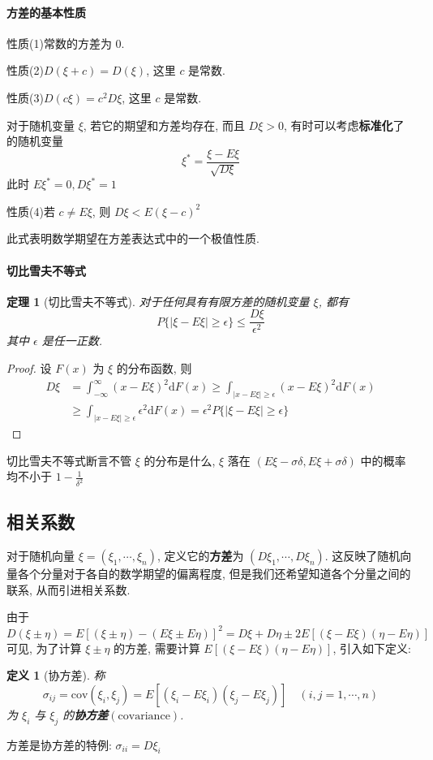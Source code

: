 \documentclass[12pt,a4paper]{article}
\newtheorem{thm}{定理}[subsection]  %
\newtheorem{definition}{定义}[subsection] %
\begin{document}
\paragraph{方差的基本性质}\mbox{}

性质(1)\quad 常数的方差为 $0$.

性质(2)\quad $D(\xi + c) = D(\xi)$, 这里 $c$ 是常数.

性质(3)\quad $D(c\xi) = c^2D\xi$, 这里 $c$ 是常数.

对于随机变量 $\xi$, 若它的期望和方差均存在, 而且 $D\xi > 0$, 有时可以考虑\textbf{标准化}了的随机变量\[\xi^* = \frac{\xi - E\xi}{\sqrt{D\xi}}\]
此时 $E\xi^* = 0, D\xi^* = 1$

性质(4)\quad 若 $c \neq E\xi$, 则 $D\xi < E(\xi - c)^2$

此式表明数学期望在方差表达式中的一个极值性质.

\paragraph{切比雪夫不等式}
\begin{thm}[切比雪夫不等式]
    对于任何具有有限方差的随机变量 $\xi$, 都有\[P\{ |\xi-E\xi| \geq \epsilon\} \leq \frac{D\xi}{\epsilon^2}\] 其中 $\epsilon$ 是任一正数.
\end{thm}
\begin{proof}
    设 $F(x)$ 为 $\xi$ 的分布函数, 则
    \[\begin{aligned}
        D\xi & = \int_{-\infty}^{\infty} (x - E\xi)^2 \mathrm{d}F(x) \geq \int_{|x-E\xi|\geq \epsilon} (x-E\xi)^2\mathrm{d}F(x)\\
        & \geq \int_{|x-E\xi| \geq \epsilon} \epsilon^2 \mathrm{d}F(x) = \epsilon^2 P\{|\xi-E\xi| \geq \epsilon\}
    \end{aligned}\]
\end{proof}
切比雪夫不等式断言不管 $\xi$ 的分布是什么, $\xi$ 落在 $(E\xi-\sigma\delta, E\xi+\sigma\delta)$ 中的概率均不小于 $1-\frac{1}{\delta^2}$
\subsection{相关系数}
对于随机向量 $\xi = (\xi_1, \cdots, \xi_n)$, 定义它的\textbf{方差}为 $(D\xi_1, \cdots, D\xi_n)$. 
这反映了随机向量各个分量对于各自的数学期望的偏离程度, 但是我们还希望知道各个分量之间的联系, 从而引进相关系数.

由于\[D(\xi \pm \eta) = E[(\xi \pm \eta) - (E\xi \pm E\eta)]^2 = D\xi + D\eta \pm 2E[(\xi - E\xi)(\eta - E\eta)]\]
可见, 为了计算 $\xi \pm \eta$ 的方差, 需要计算 $E[(\xi - E\xi)(\eta - E\eta)]$, 引入如下定义:
\begin{definition}[协方差]
    称\[\sigma_{ij} = \mathrm{cov}(\xi_i, \xi_j) = E[(\xi_i - E\xi_i)(\xi_j - E\xi_j)] \quad (i,j = 1,\cdots, n)\]
    为 $\xi_i$ 与 $\xi_j$ 的\textbf{协方差}$(\mathrm{covariance})$.
\end{definition}
方差是协方差的特例: $\sigma_{ii} = D\xi_i$
\end{document}
